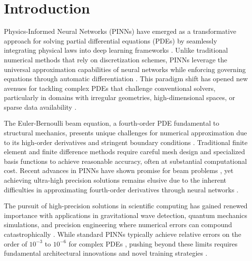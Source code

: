 \section{Introduction}\label{sec:intro}

Physics-Informed Neural Networks (PINNs) have emerged as a transformative approach for solving partial differential equations (PDEs) by seamlessly integrating physical laws into deep learning frameworks \cite{raissi2017physics1,raissi2017physics2}. Unlike traditional numerical methods that rely on discretization schemes, PINNs leverage the universal approximation capabilities of neural networks while enforcing governing equations through automatic differentiation \cite{karniadakis2021physics,cuomo2022scientific}. This paradigm shift has opened new avenues for tackling complex PDEs that challenge conventional solvers, particularly in domains with irregular geometries, high-dimensional spaces, or sparse data availability \cite{chen2021physics,pang2020fPINNs}.

The Euler-Bernoulli beam equation, a fourth-order PDE fundamental to structural mechanics, presents unique challenges for numerical approximation due to its high-order derivatives and stringent boundary conditions \cite{kapoor2023physics,zakian2023physics}. Traditional finite element and finite difference methods require careful mesh design and specialized basis functions to achieve reasonable accuracy, often at substantial computational cost. Recent advances in PINNs have shown promise for beam problems \cite{wang2024transfer,kapoor2023physics}, yet achieving ultra-high precision solutions remains elusive due to the inherent difficulties in approximating fourth-order derivatives through neural networks \cite{vahab2022physics}.

The pursuit of high-precision solutions in scientific computing has gained renewed importance with applications in gravitational wave detection, quantum mechanics simulations, and precision engineering where numerical errors can compound catastrophically \cite{mukhametzhanov2022high,wong2022learning}. While standard PINNs typically achieve relative errors on the order of $10^{-3}$ to $10^{-6}$ for complex PDEs \cite{jagtap2020conservative,lu2021deepxde}, pushing beyond these limits requires fundamental architectural innovations and novel training strategies \cite{brunton2024machine,Wang2024PINNreview}.

